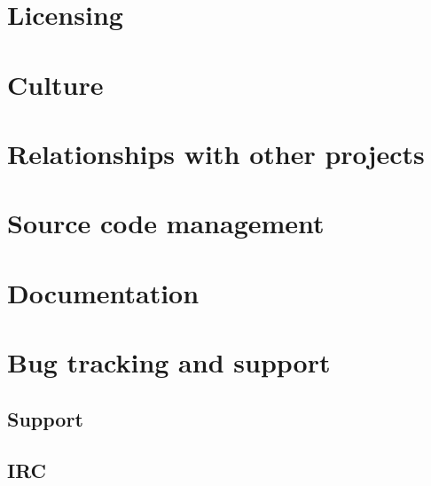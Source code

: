 \documentclass{article}
\begin{document}


\section{Licensing} %
\label{sec:licensing}


\section{Culture} %
\label{sec:culture}



\section{Relationships with other projects} %
\label{sec:relationships_with_other_projects}


\section{Source code management} %
\label{sec:source_code_management}


\section{Documentation} %
\label{sec:documentation}


\section{Bug tracking and support} %
\label{sec:bug_tracking_and_support}

\subsection{Support} %
\label{sub:support}


\subsection{IRC} %
\label{sub:irc}
\end{document}
